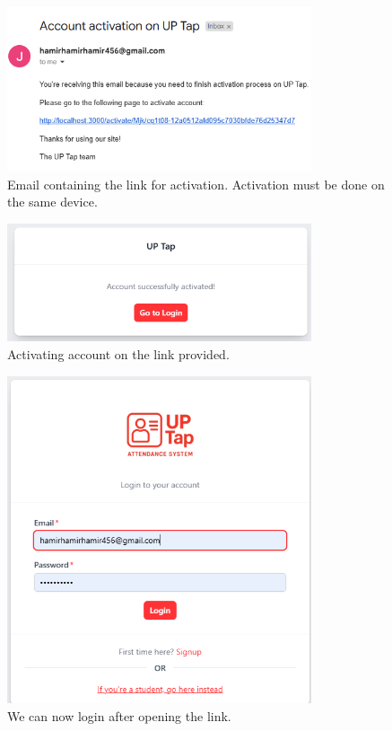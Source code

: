 \begin{figure}[h] %
	\centering
	\includegraphics[width=0.8\textwidth]{figures/chapter4/faculty_signup_email.png} %
	\caption{Email containing the link for activation. Activation must be done on the same device.}
	\label{fig:faculty_signup_email}
\end{figure}
\begin{figure}[h] %
	\centering
	\includegraphics[width=0.8\textwidth]{figures/chapter4/faculty_activation.png} %
	\caption{Activating account on the link provided.}
	\label{fig:faculty_activation}
\end{figure}
\begin{figure}[h] %
	\centering
	\includegraphics[width=0.8\textwidth]{figures/chapter4/faculty_login.png} %
	\caption{We can now login after opening the link.}
	\label{fig:faculty_login}
\end{figure}
\clearpage

